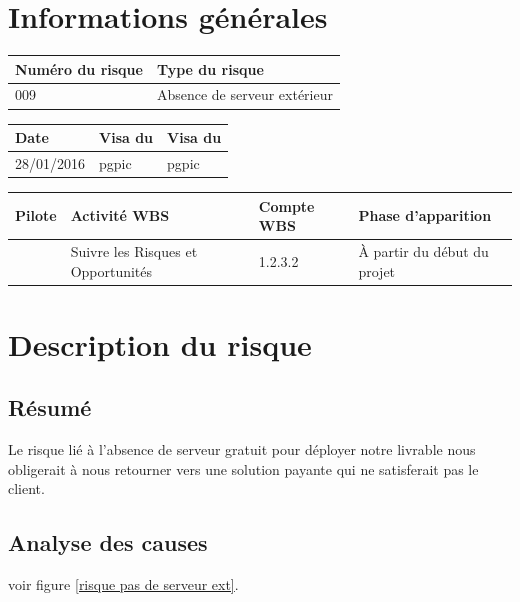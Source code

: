 
\section*{Informations générales}
 
\begin{table}[H]
\centering
	\begin{tabularx}{16.8cm}{|X|X|}
	\hline
	\rowcolor{gray!40} Numéro du risque & Type du risque \\
	\hline
	009 & Absence de serveur extérieur \\
	\hline
	\end{tabularx}
\end{table}

\begin{table}[H]
\centering
	\begin{tabularx}{16.8cm}{|X|X|X|}
	\hline
	\rowcolor{gray!40} Date & Visa du \RQ & Visa du \CP \\
	\hline
	 28/01/2016 & pgpic & pgpic \\
	\hline
	\end{tabularx}
\end{table}

\begin{table}[H]
\centering
	\begin{tabularx}{16.8cm}{|X|X|X|X|}
	\hline
	\rowcolor{gray!40} Pilote & Activité WBS & Compte WBS & Phase d'apparition \\
	\hline
	 \Matthieu & Suivre les Risques et Opportunités & 1.2.3.2 & À partir du début du projet\\
	\hline
	\end{tabularx}
\end{table}

\section*{Description du risque}

\subsection*{Résumé}
	Le risque lié à l'absence de serveur gratuit pour déployer notre livrable nous obligerait à nous retourner vers une solution payante qui ne satisferait pas le client.
	
\subsection*{Analyse des causes}
	voir figure \ref{risque pas de serveur ext}.

